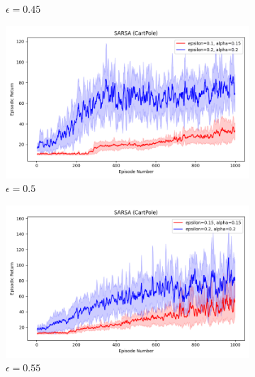 \documentclass[11pt, a4]{article}
\begin{document}
\begin{figure}[h]
\begin{subfigure}[h]{0.3\textwidth}
					\caption{$\epsilon = 0.45$}
				\end{subfigure}
				
				\vspace{0.1cm}
				
				\begin{subfigure}[h]{0.3\textwidth}
					\centering
					\includegraphics[width=\textwidth]{../cartpole-v1/plots/sarsa_0.15_0.1vs0.2_0.2.png}
					\caption{$\epsilon = 0.5$}
				\end{subfigure}
				\hfill
				\begin{subfigure}[h]{0.3\textwidth}
					\centering
					\includegraphics[width=\textwidth]{../cartpole-v1/plots/sarsa_0.15_0.15vs0.2_0.2.png}
					\caption{$\epsilon = 0.55$}
				\end{subfigure}
				\hfill
				\begin{subfigure}[h]{0.3\textwidth}
					\centering

\end{subfigure}
\end{figure}
\end{document}
